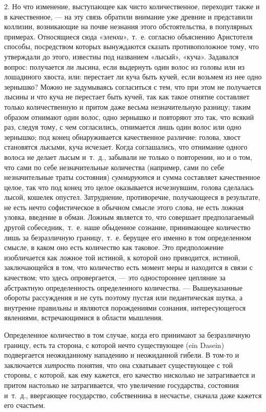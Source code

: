 2. Но что изменение, выступающее как чисто количественное, переходит также и
в качественное, — на эту связь обратили внимание уже древние и представили
коллизии, возникающие на почве незнания этого обстоятельства, в популярных
примерах. Относящиеся сюда «{\em эленхи}»,~т.~е.
согласно объяснению Аристотеля способы, посредством которых вынуждаются
сказать противоположное тому, что утверждали до этого, известны под
названием «лысый», «куча». Задавался вопрос: получается ли лысина, если
выдернуть один волос из головы или из лошадиного хвоста, или: перестает ли
куча быть кучей, если возьмем из нее одно зернышко? Можно не задумываясь
согласиться с тем, что при этом не получается лысины и что куча не
перестает быть кучей, так как такое отнятие составляет только
количественную и притом даже весьма незначительную разницу; таким образом
отнимают один волос, одно зернышко и повторяют это так, что всякий раз,
следуя тому, с чем согласились, отнимается лишь один волос или одно
зернышко; под конец обнаруживается качественное различие: голова, хвост
становятся лысыми, куча исчезает. Когда соглашались, что отнимание одного
волоса не делает лысым и~т.~д., забывали не только о повторении, но и о
том, что сами по себе незначительные количества (например, сами по себе
незначительные траты состояния) {\em суммируются} и
сумма составляет качественное целое, так что под конец это целое
оказывается исчезнувшим, голова сделалась лысой, кошелек опустел.
Затруднение, противоречие, получающееся в результате, не есть нечто
софистическое в обычном смысле этого слова, не есть ложная уловка, введение
в обман. Ложным является то, что совершает предполагаемый другой
собеседник,~т.~е. наше обыденное сознание, принимающее количество лишь за
безразличную границу,~т.~е. берущее его именно в том определенном смысле, в
каком оно есть количество как таковое. Это предположение изобличается как
ложное той истиной, к которой оно приводится, истиной, заключающейся в том,
что количество есть момент меры и находится в связи с качеством; что здесь
опровергается, — это одностороннее цепляние за абстрактную определенность
определенного количества. — Вышеуказанные обороты рассуждения и не суть
поэтому пустая или педантическая шутка, а внутренне правильны и являются
порождениями сознания, интересующегося явлениями, встречающимися в области
мышления.

Определенное количество в том случае, когда его принимают за безразличную
границу, есть та сторона, с которой нечто существующее (ein Dasein)
подвергается неожиданному нападению и неожиданной гибели. В том-то и
заключается {\em хитрость} понятия, что она схватывает
существующее с той стороны, с которой, как ему кажется, его качество
нисколько не затрагивается и притом настолько не затрагивается, что
увеличение государства, состояния и~т.~д., ввергающее государство,
собственника в несчастье, сначала даже кажется его счастьем.

